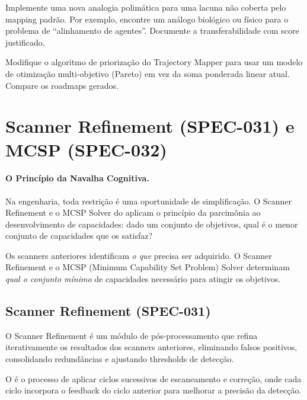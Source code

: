 \begin{exercicio}
Implemente uma nova analogia polimática para uma lacuna não coberta pelo
mapping padrão. Por exemplo, encontre um análogo biológico ou físico para
o problema de ``alinhamento de agentes''. Documente a transferabilidade
com score justificado.
\end{exercicio}

\begin{exercicio}
Modifique o algoritmo de priorização do Trajectory Mapper para usar um
modelo de otimização multi-objetivo (Pareto) em vez da soma ponderada
linear atual. Compare os roadmaps gerados.
\end{exercicio}

\section{Scanner Refinement (SPEC-031) e MCSP (SPEC-032)}
\label{sec:scanner-refinement-mcsp}
\nivelphd

\paragraph{O Princípio da Navalha Cognitiva.} Na engenharia, toda restrição é uma oportunidade de simplificação. O Scanner Refinement e o MCSP Solver do \opencodeeco{} aplicam o princípio da parcimônia ao desenvolvimento de capacidades: dado um conjunto de objetivos, qual é o menor conjunto de capacidades que os satisfaz?

Os scanners anteriores identificam \emph{o que} precisa ser adquirido. O
Scanner Refinement e o MCSP (Minimum Capability Set Problem) Solver
determinam \emph{qual o conjunto mínimo} de capacidades necessário para
atingir os objetivos.

\subsection{Scanner Refinement (SPEC-031)}

O Scanner Refinement é um módulo de pós-processamento que refina
iterativamente os resultados dos scanners anteriores, eliminando falsos
positivos, consolidando redundâncias e ajustando thresholds de detecção.

\begin{definicao}
O  é o processo de aplicar ciclos
sucessivos de escaneamento e correção, onde cada ciclo incorpora o feedback
do ciclo anterior para melhorar a precisão da detecção.
\end{definicao}

